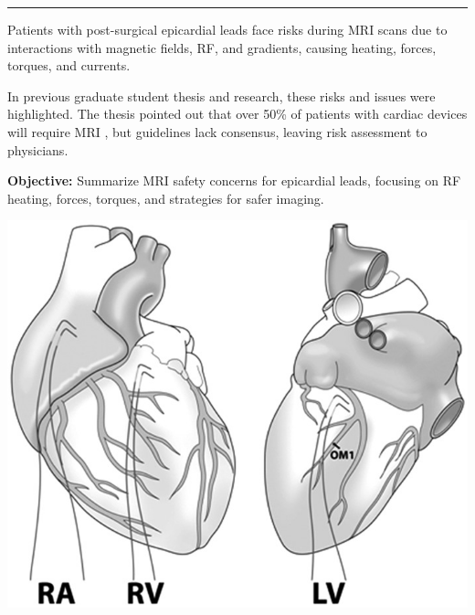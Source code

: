 \documentclass[final]{article}
\newcommand{\posterSection}[1]{
    \noindent{
        \color{DarkBlue}
        \fontsize{50}{60}\bfseries #1
    }
    \vspace{0.5em}
    \hrule
    \vspace{1em}
}
\renewcommand{\normalsize}{\fontsize{28}{34}\selectfont}
\newcommand{\boldtext}[1]{{\fontseries{b}\selectfont #1}}
\begin{document}
\setlength{\columnsep}{1.5cm} %
\begin{multicols}{3}

\posterSection{Introduction}



\begin{multicols}{2}
	\begin{minipage}[t]{0.17\textwidth}
		\normalsize
		Patients with post-surgical epicardial leads face risks during MRI scans due to interactions with magnetic fields, RF, and gradients, causing heating, forces, torques, and currents.
		
		In previous graduate student thesis and research, these risks and issues were highlighted. The thesis pointed out that over 50\% of patients with cardiac devices will require MRI \cite{haddix2022, aboyewa2021}, but guidelines lack consensus, leaving risk assessment to physicians.
		
		\textbf{Objective:} Summarize MRI safety concerns for epicardial leads, focusing on RF heating, forces, torques, and strategies for safer imaging.
	\end{minipage}%
	\hfill
	\hspace*{-0.25\linewidth} %
	\begin{minipage}[t]{0.23\textwidth}
		\centering
		\includegraphics[width=0.5\linewidth]{Position-of-temporary-pacing-wires-RA-right-atrium-RV-right-ventricular-outflow.jpg} %
		

\end{minipage}
\end{multicols}
\end{multicols}
\end{document}
